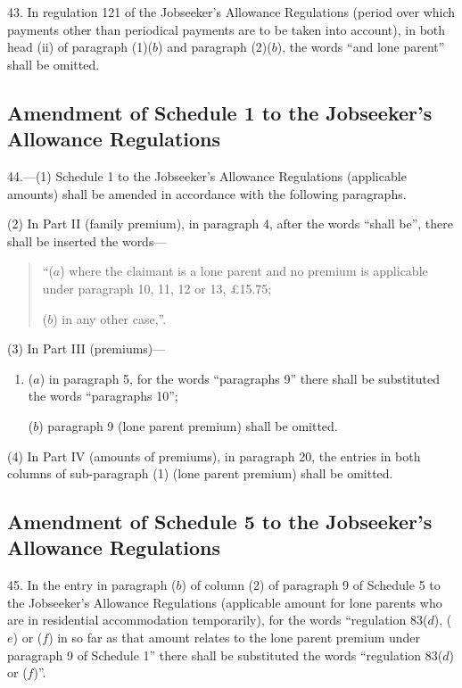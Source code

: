 \documentclass[a4paper]{article}
\begin{document}
43.  In regulation 121 of the Jobseeker’s Allowance Regulations (period over which payments other than periodical payments are to be taken into account), in both head (ii) of paragraph (1)($b$) and paragraph (2)($b$), the words “and lone parent” shall be omitted.

\subsection[44. Amendment of Schedule 1 to the Jobseeker’s Allowance Regulations]{Amendment of Schedule 1 to the Jobseeker’s Allowance Regulations}

44.—(1) Schedule 1 to the Jobseeker’s Allowance Regulations (applicable amounts) shall be amended in accordance with the following paragraphs.

(2) In Part II (family premium), in paragraph 4, after the words “shall be”, there shall be inserted the words—
\begin{quotation}
“($a$) where the claimant is a lone parent and no premium is applicable under paragraph 10, 11, 12 or 13, £15.75;

($b$) in any other case,”.
\end{quotation}

(3) In Part III (premiums)—
\begin{enumerate}\item[]
($a$) in paragraph 5, for the words “paragraphs 9” there shall be substituted the words “paragraphs 10”;

($b$) paragraph 9 (lone parent premium) shall be omitted.
\end{enumerate}

(4) In Part IV (amounts of premiums), in paragraph 20, the entries in both columns of sub-paragraph (1) (lone parent premium) shall be omitted.

\subsection[45. Amendment of Schedule 5 to the Jobseeker’s Allowance Regulations]{Amendment of Schedule 5 to the Jobseeker’s Allowance Regulations}

45.  In the entry in paragraph ($b$) of column (2) of paragraph 9 of Schedule 5 to the Jobseeker’s Allowance Regulations (applicable amount for lone parents who are in residential accommodation temporarily), for the words “regulation 83($d$), ($e$) or ($f$) in so far as that amount relates to the lone parent premium under paragraph 9 of Schedule 1” there shall be substituted the words “regulation 83($d$) or ($f$)”.
\end{document}
